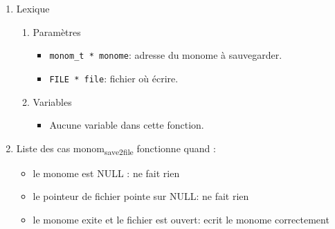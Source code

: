 \documentclass[11pt]{article}
\begin{document}
\begin{enumerate}
\item Lexique
\label{sec:orge4eede6}
\begin{enumerate}
\item Paramètres
\label{sec:orgbf1da5e}
\begin{itemize}
\item \texttt{monom\_t * monome}: adresse du monome à sauvegarder.
\item \texttt{FILE * file}: fichier où écrire.
\end{itemize}
\item Variables
\label{sec:org1a7a21f}
\begin{itemize}
\item Aucune variable dans cette fonction.
\end{itemize}
\end{enumerate}
\item Liste des cas
\label{sec:org5d63538}
monom\textsubscript{save2file} fonctionne quand :
\begin{itemize}
\item le monome est NULL : ne fait rien
\item le pointeur de fichier pointe sur NULL: ne fait rien
\item le monome exite et le fichier est ouvert: ecrit le monome correctement
\end{itemize}
\end{enumerate}
\end{document}
